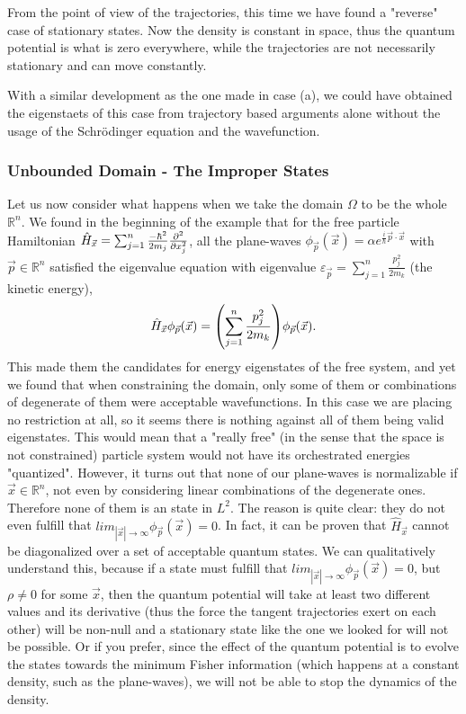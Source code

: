 \documentclass[11pt, a4paper]{article} %
\newcommand{\R}{\mathbb{R}} %
\begin{document}
From the point of view of the trajectories, this time we have found a "reverse" case of stationary states. Now the density is constant in space, thus the quantum potential is what is zero everywhere, while the trajectories are not necessarily stationary and can move constantly.

With a similar development as the one made in case (a), we could have obtained the eigenstaets of this case from trajectory based arguments alone without the usage of the Schrödinger equation and the wavefunction.

\subsubsection*{Unbounded Domain - The Improper States}
Let us now consider what happens when we take the domain $\Omega$ to be the whole $\R^n$. We found in the beginning of the example that for the free particle Hamiltonian $\hat{H}_{\vec{x}}=\sum_{j=1}^n\frac{-\hbar^2}{2m_j}\pdv[2]{}{x_j}$, all the plane-waves $\phi_{\vec{p}}(\vec{x})=\alpha e^{\frac{i}{\hbar}\vec{p}\cdot\vec{x}}$ with $\vec{p}\in\R^n$ satisfied the eigenvalue equation with eigenvalue $\varepsilon_{\vec{p}}=\sum_{j=1}^n\frac{p_j^2}{2m_k}$ (the kinetic energy),
\begin{equation}
\hat{H}_{\vec{x}}\phi_{\vec{p}}(\vec{x}) = \qty(\sum_{j=1}^n\frac{p_j^2}{2m_k}) \phi_{\vec{p}}(\vec{x}).
\end{equation}
This made them the candidates for energy eigenstates of the free system, and yet we found that when constraining the domain, only some of them or combinations of degenerate of them were acceptable wavefunctions. In this case we are placing no restriction at all, so it seems there is nothing against all of them being valid eigenstates. This would mean that a "really free" (in the sense that the space is not constrained) particle system would not have its orchestrated energies "quantized". However, it turns out that none of our plane-waves is normalizable if $\vec{x}\in\R^n$, not even by considering linear combinations of the degenerate ones. Therefore none of them is an state in $L^2$. The reason is quite clear: they do not even fulfill that $lim_{|\vec{x}|\rightarrow \infty}\phi_{\vec{p}}(\vec{x})=0$. In fact, it can be proven that $\hat{H}_{\vec{x}}$ cannot be diagonalized over a set of acceptable quantum states. We can qualitatively understand this, because if a state must fulfill that $lim_{|\vec{x}|\rightarrow \infty}\phi_{\vec{p}}(\vec{x})=0$, but $\rho\neq 0$ for some $\vec{x}$, then the quantum potential will take at least two different values and its derivative (thus the force the tangent trajectories exert on each other) will be non-null and a stationary state like the one we looked for will not be possible. Or if you prefer, since the effect of the quantum potential is to evolve the states towards the minimum Fisher information (which happens at a constant density, such as the plane-waves), we will not be able to stop the dynamics of the density. 
\end{document}
